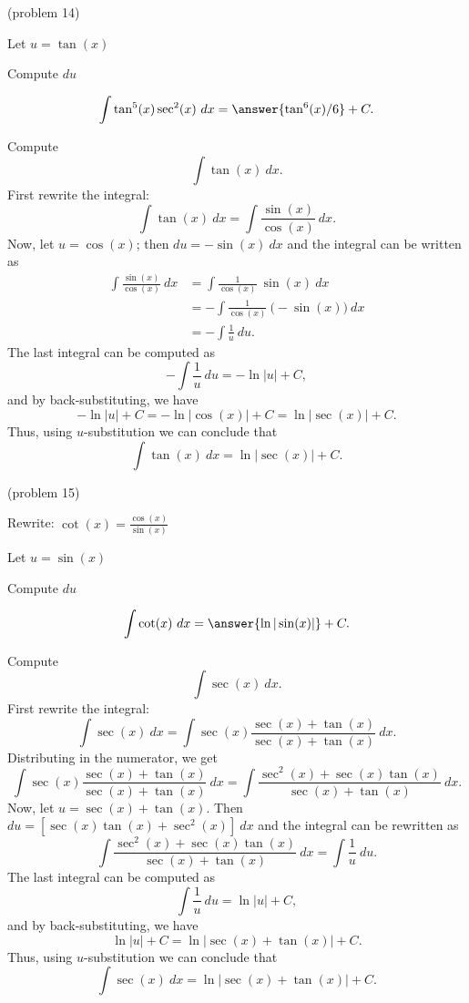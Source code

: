 \documentclass[handout]{ximera}
\begin{document}
\begin{problem}(problem 14)
\begin{hint}
Let $u = \tan(x)$
\end{hint}
\begin{hint}
Compute $du$
\end{hint}
\[\int \tan^5(x)\sec^2(x) \ dx = \answer{\tan^6(x)/6} +C.\]
\end{problem}

\begin{example}[example 15] Compute 
\[\int \tan(x) \ dx.\]
First rewrite the integral:
\[\int \tan(x) \ dx =\int \frac{\sin(x)}{\cos(x)} \ dx.\]
Now, let $u = \cos(x)$; then $du = -\sin(x) \ dx$
and the integral can be written as
\begin{align*}
\int \frac{\sin(x)}{\cos(x)} \ dx &= \int \frac{1}{\cos(x)}\ \sin(x) \  dx \\
 &=  - \int \frac{1}{\cos(x)}\ \big(-\sin(x)\big) \  dx\\
&=-\int \frac{1}{u} \ du.
\end{align*}
The last integral can be computed as 
\[-\int \frac{1}{u} \ du = -\ln|u| + C,\]
and by back-substituting, we have 
\[-\ln|u| + C = -\ln|\cos(x)| + C = \ln|\sec(x)| +C.\]
Thus, using $u$-substitution we can conclude that
\[\int \tan(x) \ dx =  \ln|\sec(x)| + C.\]
\end{example}

\begin{problem}(problem 15)
\begin{hint}
Rewrite: $\cot(x) = \frac{\cos(x)}{\sin(x)}$
\end{hint}
\begin{hint}
Let $u = \sin(x)$
\end{hint}
\begin{hint}
Compute $du$
\end{hint}
\[\int \cot(x) \ dx = \answer{\ln|\sin(x)|} +C.\]


\end{problem}


\begin{example}[example 16] Compute 
\[\int \sec(x) \ dx.\]
First rewrite the integral:
\[\int \sec(x) \ dx =\int \sec(x)\frac{\sec(x)+\tan(x)}{\sec(x)+\tan(x)} \ dx.\]
Distributing in the numerator, we get
\[\int \sec(x)\frac{\sec(x)+\tan(x)}{\sec(x)+\tan(x)} \ dx = \int \frac{\sec^2(x)+\sec(x)\tan(x)}{\sec(x)+\tan(x)} \ dx.\]
Now, let $u = \sec(x) + \tan(x)$. Then $du = [\sec(x)\tan(x) + \sec^2(x)] \ dx$ and the integral can be rewritten as
\[ \int \frac{\sec^2(x)+\sec(x)\tan(x)}{\sec(x)+\tan(x)} \ dx = \int \frac{1}{u} \ du.\]
The last integral can be computed as
\[\int \frac{1}{u} \ du = \ln|u| + C,\]
and by back-substituting, we have 
\[\ln|u| + C = \ln|\sec(x) + \tan(x)| + C.\]
Thus, using $u$-substitution we can conclude that
\[\int \sec(x) \ dx =  \ln|\sec(x) + \tan(x)| + C.\]
\end{example}


\begin{center}
\begin{foldable}
\end{foldable}
\end{center}
\end{document}
